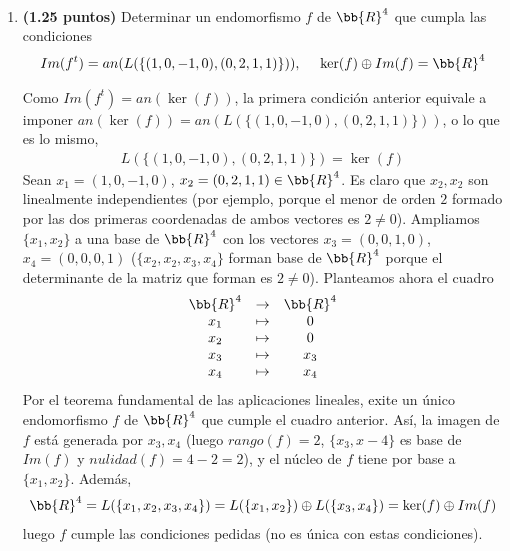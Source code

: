 \documentclass[12pt]{article}
\begin{document}
    \newpage

    \begin{ejercicio}[2.5 puntos] \ 
        \begin{enumerate}
            \item \textbf{(1.25 puntos)} Determinar un endomorfismo $f$ de $\bb{R}^4$ que cumpla las condiciones
            \begin{gather*}
                Im(f^t) = an(L(\{(1,0,-1,0),(0,2,1,1)\})), \ \ \ \ \ker(f) \oplus Im(f) = \bb{R}^4
            \end{gather*}

            Como $Im(f^t)=an(\ker(f))$, la primera condición anterior equivale a imponer $an(\ker(f)) = an(L(\{(1,0,-1,0),(0,2,1,1)\}))$, o lo que es lo mismo,
            \begin{gather*}
                L(\{(1,0,-1,0),(0,2,1,1)\}) = \ker(f)
            \end{gather*}
            Sean $x_1 = (1,0,-1,0)$, $x_2 = (0,2,1,1) \in \bb{R}^4$. Es claro que $x_2, x_2$ son linealmente independientes (por ejemplo, porque el menor de orden $2$ formado por las dos primeras coordenadas de ambos vectores es $2 \neq 0$). Ampliamos $\{x_1, x_2\}$ a una base de $\bb{R}^4$ con los vectores $x_3 = (0,0,1,0)$, $x_4 = (0,0,0,1)$ ($\{x_2, x_2, x_3, x_4\}$ forman base de $\bb{R}^4$ porque el determinante de la matriz que forman es $2 \neq 0$). Planteamos ahora el cuadro
            \begin{gather*}
                \begin{array}{ccc}
                    \bb{R}^4 & \rightarrow & \bb{R}^4\\
                    x_1 & \mapsto & 0 \\
                    x_2 & \mapsto & 0 \\
                    x_3 & \mapsto & x_3 \\
                    x_4 & \mapsto & x_4 \\
                \end{array}
            \end{gather*}
            Por el teorema fundamental de las aplicaciones lineales, exite un único endomorfismo $f$ de $\bb{R}^4$ que cumple el cuadro anterior. Así, la imagen de $f$ está generada por $x_3, x_4$ (luego $rango(f) = 2$, $\{x_3,x-4\}$ es base de $Im(f)$ y $nulidad(f) = 4 -2 = 2$), y el núcleo de $f$ tiene por base a $\{x_1, x_2\}$. Además,
            \begin{gather*}
                \bb{R}^4 = L(\{x_1, x_2, x_3, x_4\}) = L(\{x_1, x_2\}) \oplus L(\{x_3, x_4\}) = \ker(f) \oplus Im(f)
            \end{gather*}
            luego $f$ cumple las condiciones pedidas (no es única con estas condiciones).


\end{enumerate}
\end{ejercicio}
\end{document}
